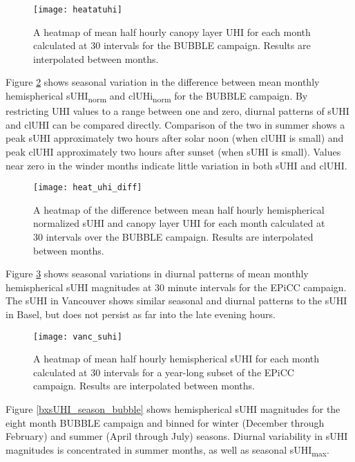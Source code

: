 \begin{bibunit}
\begin{figure}[H]
	\centering
	\texttt{[image: heatatuhi]}
	\caption{A heatmap of mean half hourly canopy layer UHI for each month calculated at 30 \si{\min} intervals for the BUBBLE campaign. Results are interpolated between months.}
	\label{heatcluhi}
\end{figure}

Figure \ref{heat_uhi_diff} shows seasonal variation in the difference between mean monthly hemispherical sUHI\textsubscript{norm} and clUHi\textsubscript{norm} for the BUBBLE campaign. By restricting UHI values to a range between one and zero, diurnal patterns of sUHI and clUHI can be compared directly. Comparison of the two in summer shows a peak sUHI approximately two hours after solar noon (when clUHI is small) and peak clUHI approximately two hours after sunset (when sUHI is small). Values near zero in the winder months indicate little variation in both sUHI and clUHI.

\begin{figure}[H]
	\centering
	\texttt{[image: heat\_uhi\_diff]}
	\caption{A heatmap of the difference between mean half hourly hemispherical normalized sUHI and canopy layer UHI for each month calculated at 30 \si{\min} intervals over the BUBBLE campaign. Results are interpolated between months.}
	\label{heat_uhi_diff}
\end{figure}

Figure \ref{vanc_suhi} shows seasonal variations in diurnal patterns of mean monthly hemispherical sUHI magnitudes at 30 minute intervals for the EPiCC campaign. The sUHI in Vancouver shows similar seasonal and diurnal patterns to the sUHI in Basel, but does not persist as far into the late evening hours.

\begin{figure}[H]
	\centering
	\texttt{[image: vanc\_suhi]}
	\caption{A heatmap of mean half hourly hemispherical sUHI for each month calculated at 30 \si{\min} intervals for a year-long subset of the EPiCC campaign. Results are interpolated between months.}
	\label{vanc_suhi}
\end{figure}

Figure \ref{bxsUHI_season_bubble} shows hemispherical sUHI magnitudes for the eight month BUBBLE campaign and binned for winter (December through February) and summer (April through July) seasons. Diurnal variability in sUHI magnitudes is concentrated in summer months, as well as seasonal sUHI\textsubscript{max}. 


\end{bibunit}
